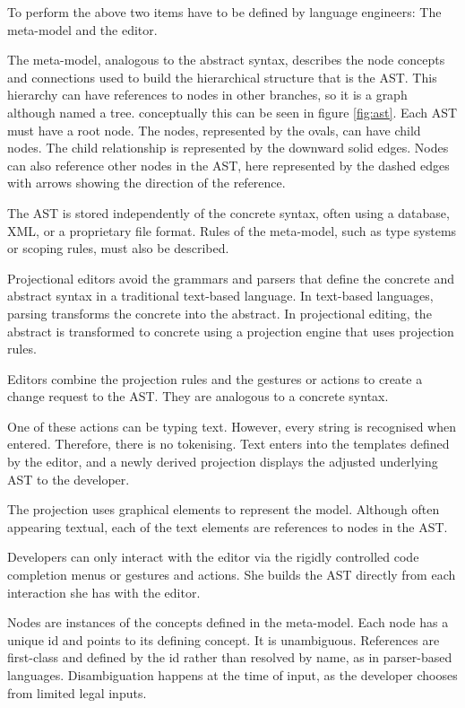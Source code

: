 To perform the above two items have to be defined by language engineers: The meta-model and the editor.

The meta-model, analogous to the abstract syntax, describes the node concepts and connections used to build the hierarchical structure that is the AST.
This hierarchy can have references to nodes in other branches, so it is a graph although named a tree. 
conceptually this can be seen in figure \ref{fig:ast}.
Each AST must have a root node. 
The nodes, represented by the ovals, can have child nodes.
The child relationship is represented by the downward solid edges.
Nodes can also reference other nodes in the AST, here represented by the dashed edges with arrows showing the direction of the reference.

The AST is stored independently of the concrete syntax, often using a database, XML, or a proprietary file format.
Rules of the meta-model, such as type systems or scoping rules, must also be described.

Projectional editors avoid the grammars and parsers that define the concrete and abstract syntax in a traditional text-based language.
In text-based languages, parsing transforms the concrete into the abstract.
In projectional editing, the abstract is transformed to concrete using a projection engine that uses projection rules.

Editors combine the projection rules and the gestures or actions to create a change request to the AST.
They are analogous to a concrete syntax.

One of these actions can be typing text. 
However, every string is recognised when entered.
Therefore, there is no tokenising.
Text enters into the templates defined by the editor, and a newly derived projection displays the adjusted underlying AST to the developer.

The projection uses graphical elements to represent the model.
Although often appearing textual, each of the text elements are references to nodes in the AST.

Developers can only interact with the editor via the rigidly controlled code completion menus or gestures and actions.
She builds the AST directly from each interaction she has with the editor.

Nodes are instances of the concepts defined in the meta-model.
Each node has a unique id and points to its defining concept.
It is unambiguous.
References are first-class and defined by the id rather than resolved by name, as in parser-based languages.
Disambiguation happens at the time of input, as the developer chooses from limited legal inputs.

